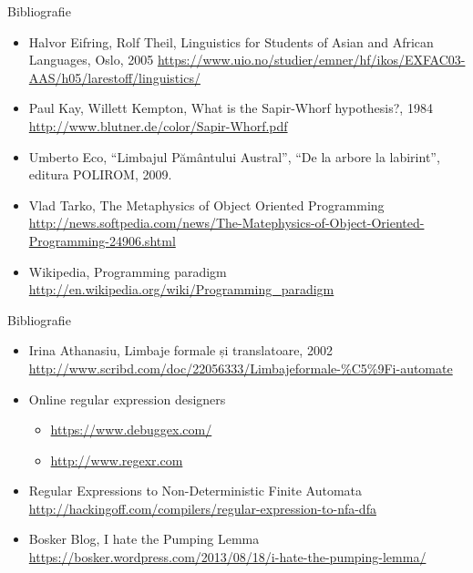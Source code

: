 \documentclass[pdf]{beamer}
\begin{document}
\begin{frame}{Bibliografie}
\begin{itemize}
\item
Halvor Eifring, Rolf Theil, Linguistics for Students of Asian and African Languages, Oslo, 2005
\url{https://www.uio.no/studier/emner/hf/ikos/EXFAC03-AAS/h05/larestoff/linguistics/}
\item
Paul Kay, Willett Kempton, What is the Sapir-Whorf hypothesis?, 1984
\url{http://www.blutner.de/color/Sapir-Whorf.pdf}
\item
Umberto Eco, “Limbajul Pământului Austral”, “De la arbore la labirint”, editura POLIROM, 2009.
\item
Vlad Tarko, The Metaphysics of Object Oriented Programming
\url{http://news.softpedia.com/news/The-Matephysics-of-Object-Oriented-Programming-24906.shtml}
\item
Wikipedia, Programming paradigm
\url{http://en.wikipedia.org/wiki/Programming\_paradigm}
\end{itemize}
\end{frame}


\begin{frame}{Bibliografie}
\begin{itemize}
\item
Irina Athanasiu, Limbaje formale și translatoare, 2002
\url{http://www.scribd.com/doc/22056333/Limbajeformale-\%C5\%9Fi-automate}
\item
Online regular expression designers
\begin{itemize}
\item
\url{https://www.debuggex.com/}
\item
\url{http://www.regexr.com}
\end{itemize}
\item
Regular Expressions to Non-Deterministic Finite Automata
\url{http://hackingoff.com/compilers/regular-expression-to-nfa-dfa}
\item
Bosker Blog, I hate the Pumping Lemma
\url{https://bosker.wordpress.com/2013/08/18/i-hate-the-pumping-lemma/}
\end{itemize}
\end{frame}
\end{document}
